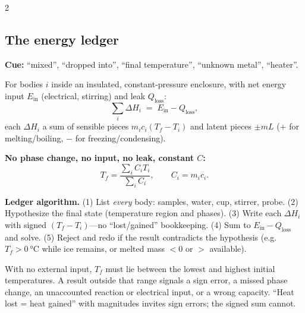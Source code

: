 \begin{multicols}{2}
\subsection{The energy ledger}\label{sec:ledger}
\CORE{} \textbf{Cue:} ``mixed'', ``dropped into'', ``final temperature'', ``unknown metal'', ``heater''.
\begin{formulabox}For bodies $i$ inside an insulated, constant-pressure enclosure, with net energy input $E_{\text{in}}$ (electrical, stirring) and leak $Q_{\text{loss}}$:
\begin{equation}
\sum_i \Delta H_i \;=\; E_{\text{in}} - Q_{\text{loss}}, \label{F:cal:ledger}
\end{equation}
each $\Delta H_i$ a sum of sensible pieces $m_ic_i(T_f-T_{i})$ and latent pieces $\pm m L$ ($+$ for melting/boiling, $-$ for freezing/condensing).
\end{formulabox}
\textbf{No phase change, no input, no leak, constant $C$:}
\begin{equation}
T_f=\frac{\sum_i C_iT_i}{\sum_i C_i},\qquad C_i=m_ic_i. \label{F:cal:mixT}
\end{equation}

\begin{keybox}\textbf{Ledger algorithm.} (1) List \emph{every} body: samples, water, cup, stirrer, probe. (2) Hypothesize the final state (temperature region and phases). (3) Write each $\Delta H_i$ with signed $(T_f-T_i)$---no ``lost/gained'' bookkeeping. (4) Sum to $E_{\text{in}}-Q_{\text{loss}}$ and solve. (5) Reject and redo if the result contradicts the hypothesis (e.g.\ $T_f>\SI{0}{\celsius}$ while ice remains, or melted mass $<0$ or $>$ available).\end{keybox}

\begin{trapbox}With no external input, $T_f$ must lie between the lowest and highest initial temperatures. A result outside that range signals a sign error, a missed phase change, an unaccounted reaction or electrical input, or a wrong capacity. ``Heat lost = heat gained'' with magnitudes invites sign errors; the signed sum cannot.\end{trapbox}


\end{multicols}
